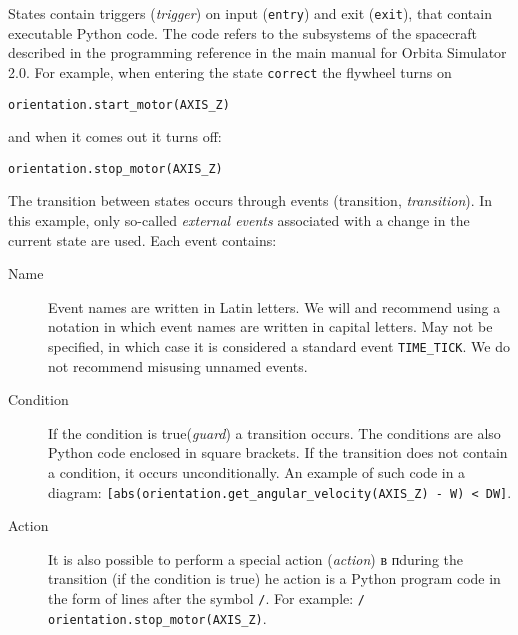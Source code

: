\documentclass[12pt,a4paper]{article}
\begin{document}
States contain triggers (\emph{trigger}) on input (\verb'entry') and exit (\verb'exit'), that contain executable Python code. The code refers to the subsystems of the spacecraft described in the programming reference in the main manual for Orbita Simulator 2.0. For example, when entering the state \verb'correct' the flywheel turns on

\begin{verbatim}
orientation.start_motor(AXIS_Z)
\end{verbatim}

and when it comes out it turns off:

\begin{verbatim}
orientation.stop_motor(AXIS_Z)
\end{verbatim}

The transition between states occurs through events (transition, \emph{transition}). In this example, only so-called \emph{external events} associated with a change in the current state are used. Each event contains:

\begin{description}
\item[Name] Event names are written in Latin letters. We will and recommend using a notation in which event names are written in capital letters. May not be specified, in which case it is considered a standard event \verb'TIME_TICK'. We do not recommend misusing unnamed events.
\item[Condition] If the condition is true(\emph{guard}) a transition occurs. The conditions are also Python code enclosed in square brackets. If the transition does not contain a condition, it occurs unconditionally. An example of such code in a diagram:
  \verb'[abs(orientation.get_angular_velocity(AXIS_Z) - W) < DW]'.
\item[Action] It is also possible to perform a special action (\emph{action}) в
  пduring the transition (if the condition is true) he action is a Python program code in the form of lines after the symbol \verb'/'. For example: \verb'/ orientation.stop_motor(AXIS_Z)'.
\end{description}
\end{document}
